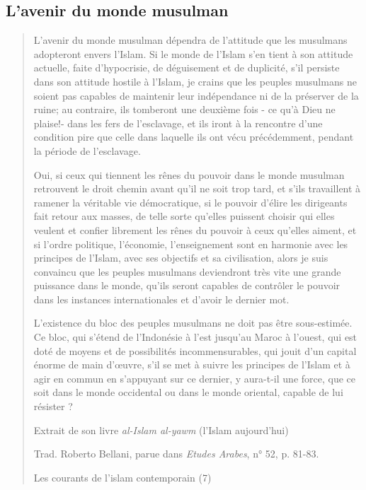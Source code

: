 \hypertarget{lavenir-du-monde-musulman}{%
\subsection{L'avenir du monde
musulman}\label{lavenir-du-monde-musulman}}

\begin{quote}
L'avenir du monde musulman dépendra de l'attitude que les musulmans
adopteront envers l'Islam. Si le monde de l'Islam s'en tient à son
attitude actuelle, faite d'hypocrisie, de déguisement et de duplicité,
s'il persiste dans son attitude hostile à l'Islam, je crains que les
peuples musulmans ne soient pas capables de maintenir leur indépendance
ni de la préserver de la ruine; au contraire, ils tomberont une deuxième
fois - ce qu'à Dieu ne plaise!- dans les fers de l'esclavage, et ils
iront à la rencontre d'une condition pire que celle dans laquelle ils
ont vécu précédemment, pendant la période de l'esclavage.

Oui, si ceux qui tiennent les rênes du pouvoir dans le monde musulman
retrouvent le droit chemin avant qu'il ne soit trop tard, et s'ils
travaillent à ramener la véritable vie démocratique, si le pouvoir
d'élire les dirigeants fait retour aux masses, de telle sorte qu'elles
puissent choisir qui elles veulent et confier librement les rênes du
pouvoir à ceux qu'elles aiment, et si l'ordre politique, l'économie,
l'enseignement sont en harmonie avec les principes de l'Islam, avec ses
objectifs et sa civilisation, alors je suis convaincu que les peuples
musulmans deviendront très vite une grande puissance dans le monde,
qu'ils seront capables de contrôler le pouvoir dans les instances
internationales et d'avoir le dernier mot.

L'existence du bloc des peuples musulmans ne doit pas être sous-estimée.
Ce bloc, qui s'étend de l'Indonésie à l'est jusqu'au Maroc à l'ouest,
qui est doté de moyens et de possibilités incommensurables, qui jouit
d'un capital énorme de main d'œuvre, s'il se met à suivre les principes
de l'Islam et à agir en commun en s'appuyant sur ce dernier, y aura-t-il
une force, que ce soit dans le monde occidental ou dans le monde
oriental, capable de lui résister ?

Extrait de son livre \emph{al-Islam al-yawm} (l'Islam aujourd'hui)

Trad. Roberto Bellani, parue dans \emph{Etudes Arabes}, n° 52, p. 81-83.

Les courants de l'islam contemporain (7)
\end{quote}

